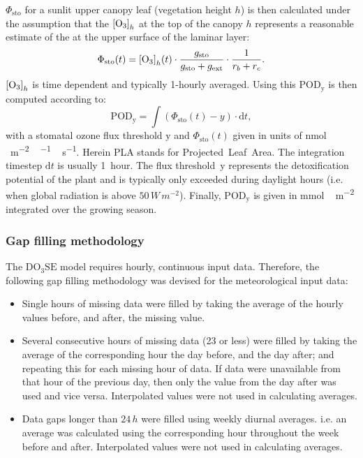 \documentclass[bg, manuscript]{copernicus}
\begin{document}
$\Phi_\mathrm{sto}$ for a sunlit upper canopy leaf (vegetation height $h$) is then calculated under the assumption that the $\chem{[O_3]}_h$ at the top of the canopy $h$ represents a reasonable estimate of the \chem{[O_3]} at the upper surface of the laminar layer:
%
\begin{equation}
  \Phi_\mathrm{sto}(t) = \chem{[O_3]}_h(t) \cdot \frac{g_\mathrm{sto}}{g_\mathrm{sto}+g_\mathrm{ext}} \cdot \frac{1}{r_b+r_c}.
  \label{eq:flux_stomata}
\end{equation}
$\chem{[O_3]}_h$ is time dependent and typically 1-hourly averaged. Using this $\mathrm{POD_y}$ is then computed according to:
%
\begin{equation}
  \mathrm{POD_y} = \int{(\Phi_\mathrm{sto}(t)-y)\cdot \mathrm{d}t},
  \label{eq:pod}
\end{equation}
%
with a stomatal ozone flux threshold $\mathrm{y}$ and $\Phi_\mathrm{sto}(t)$ given in units of \unit{nmol\,\,m^{-2}\,^{-1}\,s^{-1}}. Herein PLA stands for Projected~Leaf~Area. The integration timestep $\mathrm{d}t$ is usually 1~hour. The flux threshold~$\mathrm{y}$ represents the detoxification potential of the plant and is typically only exceeded during daylight hours (i.e. when global radiation is above $50\,\unit{W\,m^{-2}}$). Finally, $\mathrm{POD_y}$ is given in \unit{mmol\,m^{-2}} integrated over the growing season.

\subsubsection{Gap filling methodology}
\label{subsec:gap_filling}
The $\mathrm{DO_3SE}$ model requires hourly, continuous input data. Therefore, the following gap filling methodology was devised for the meteorological input data:
\begin{itemize}
\item Single hours of missing data were filled by taking the average of the hourly values before, and after, the missing value.
\item Several consecutive hours of missing data (23 or less) were filled by taking the average of the corresponding hour the day before, and the day after; and repeating this for each missing hour of data. If data were unavailable from that hour of the previous day, then only the value from the day after was used and vice versa. Interpolated values were not used in calculating averages.
\item Data gaps longer than $24\,\unit{h}$ were filled using weekly diurnal averages. i.e. an average was calculated using the corresponding hour throughout the week before and after. Interpolated values were not used in calculating averages.
\end{itemize}
\end{document}
